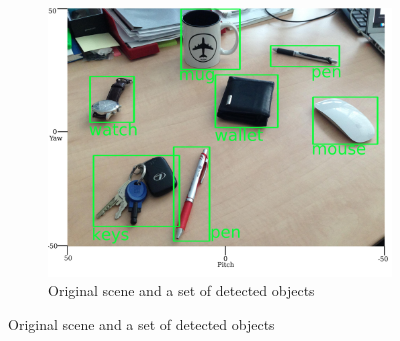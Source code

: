 \documentclass[journal]{journal}
\begin{document}
	
	\begin{figure}[th!]
		\center
		\begin{subfigure}{1.0\columnwidth}
			\center
			\includegraphics[width=0.6\columnwidth]{img/map_ticks.jpg}
			\caption{Original scene and a set of detected objects}
			\label{fig:object-detection}
		\end{subfigure}
		

\end{figure}
\end{document}
